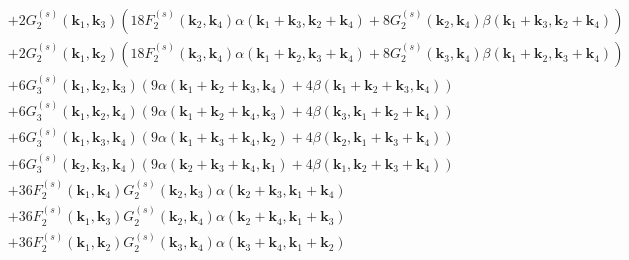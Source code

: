 \begin{align*}
    & +2 G_{2}^{(s)}\left(\mathbf{k}_{1}, \mathbf{k}_{3}\right)\left(18 F_{2}^{(s)}\left(\mathbf{k}_{2}, \mathbf{k}_{4}\right) \alpha\left(\mathbf{k}_{1}+\mathbf{k}_{3}, \mathbf{k}_{2}+\mathbf{k}_{4}\right)+8 G_{2}^{(s)}\left(\mathbf{k}_{2}, \mathbf{k}_{4}\right) \beta\left(\mathbf{k}_{1}+\mathbf{k}_{3}, \mathbf{k}_{2}+\mathbf{k}_{4}\right)\right) \\
    & +2 G_{2}^{(s)}\left(\mathbf{k}_{1}, \mathbf{k}_{2}\right)\left(18 F_{2}^{(s)}\left(\mathbf{k}_{3}, \mathbf{k}_{4}\right) \alpha\left(\mathbf{k}_{1}+\mathbf{k}_{2}, \mathbf{k}_{3}+\mathbf{k}_{4}\right)+8 G_{2}^{(s)}\left(\mathbf{k}_{3}, \mathbf{k}_{4}\right) \beta\left(\mathbf{k}_{1}+\mathbf{k}_{2}, \mathbf{k}_{3}+\mathbf{k}_{4}\right)\right) \\
    & +6 G_{3}^{(s)}\left(\mathbf{k}_{1}, \mathbf{k}_{2}, \mathbf{k}_{3}\right)\left(9 \alpha\left(\mathbf{k}_{1}+\mathbf{k}_{2}+\mathbf{k}_{3}, \mathbf{k}_{4}\right)+4 \beta\left(\mathbf{k}_{1}+\mathbf{k}_{2}+\mathbf{k}_{3}, \mathbf{k}_{4}\right)\right) \\
    & +6 G_{3}^{(s)}\left(\mathbf{k}_{1}, \mathbf{k}_{2}, \mathbf{k}_{4}\right)\left(9 \alpha\left(\mathbf{k}_{1}+\mathbf{k}_{2}+\mathbf{k}_{4}, \mathbf{k}_{3}\right)+4 \beta\left(\mathbf{k}_{3}, \mathbf{k}_{1}+\mathbf{k}_{2}+\mathbf{k}_{4}\right)\right) \\
    & +6 G_{3}^{(s)}\left(\mathbf{k}_{1}, \mathbf{k}_{3}, \mathbf{k}_{4}\right)\left(9 \alpha\left(\mathbf{k}_{1}+\mathbf{k}_{3}+\mathbf{k}_{4}, \mathbf{k}_{2}\right)+4 \beta\left(\mathbf{k}_{2}, \mathbf{k}_{1}+\mathbf{k}_{3}+\mathbf{k}_{4}\right)\right) \\
    & +6 G_{3}^{(s)}\left(\mathbf{k}_{2}, \mathbf{k}_{3}, \mathbf{k}_{4}\right)\left(9 \alpha\left(\mathbf{k}_{2}+\mathbf{k}_{3}+\mathbf{k}_{4}, \mathbf{k}_{1}\right)+4 \beta\left(\mathbf{k}_{1}, \mathbf{k}_{2}+\mathbf{k}_{3}+\mathbf{k}_{4}\right)\right) \\
    & +36 F_{2}^{(s)}\left(\mathbf{k}_{1}, \mathbf{k}_{4}\right) G_{2}^{(s)}\left(\mathbf{k}_{2}, \mathbf{k}_{3}\right) \alpha\left(\mathbf{k}_{2}+\mathbf{k}_{3}, \mathbf{k}_{1}+\mathbf{k}_{4}\right) \\
    & +36 F_{2}^{(s)}\left(\mathbf{k}_{1}, \mathbf{k}_{3}\right) G_{2}^{(s)}\left(\mathbf{k}_{2}, \mathbf{k}_{4}\right) \alpha\left(\mathbf{k}_{2}+\mathbf{k}_{4}, \mathbf{k}_{1}+\mathbf{k}_{3}\right) \\
    & +36 F_{2}^{(s)}\left(\mathbf{k}_{1}, \mathbf{k}_{2}\right) G_{2}^{(s)}\left(\mathbf{k}_{3}, \mathbf{k}_{4}\right) \alpha\left(\mathbf{k}_{3}+\mathbf{k}_{4}, \mathbf{k}_{1}+\mathbf{k}_{2}\right) \\

\end{align*}
